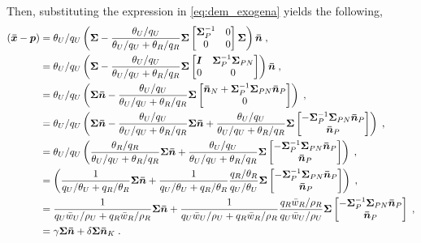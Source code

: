 Then, substituting the expression in \eqref{eq:dem_exogena} yields the following,
\begin{equation}
	\begin{split}
		(\bm{\Bar{x}}-\bm{p})&=\theta_{U}/q_{U}\left(\bm{\Sigma} - \frac{\theta_U/q_U}{\theta_U/q_U + \theta_R/q_R}\bm{\Sigma}\begin{bmatrix}
			\bm{\Sigma}^{-1}_{P} & 0\\
			0 & 0
		\end{bmatrix}
		\bm{\Sigma}
		\right)\bm{\Bar{n}}\;,\\
		&=\theta_{U}/q_{U}\left(\bm{\Sigma} - \frac{\theta_U/q_U}{\theta_U/q_U + \theta_R/q_R}\bm{\Sigma}\begin{bmatrix}
			\bm{I} & \bm{\Sigma}^{-1}_{P}\bm{\Sigma}_{PN}\\
			0 & 0
		\end{bmatrix}
		\right)\bm{\Bar{n}}\;,\\
		&= \theta_{U}/q_{U}\left(\bm{\Sigma}\bm{\Bar{n}} - \frac{\theta_U/q_U}{\theta_U/q_U + \theta_R/q_R}\bm{\Sigma}\begin{bmatrix}
			\bm{\Bar{n}}_{N}+\bm{\Sigma}^{-1}_{P}\bm{\Sigma}_{PN}\bm{\Bar{n}}_{P}\\
			0 
		\end{bmatrix}
		\right)\;,\\
		&= \theta_{U}/q_{U}\left(\bm{\Sigma}\bm{\Bar{n}} -\frac{\theta_U/q_U}{\theta_U/q_U + \theta_R/q_R}\bm{\Sigma}\bm{\Bar{n}}+ \frac{\theta_U/q_U}{\theta_U/q_U + \theta_R/q_R}\bm{\Sigma}\begin{bmatrix}
			-\bm{\Sigma}^{-1}_{P}\bm{\Sigma}_{PN}\bm{\Bar{n}}_{P}\\
			\bm{\Bar{n}}_{P} 
		\end{bmatrix}
		\right)\;,\\
		&= \theta_{U}/q_{U}\left(\frac{\theta_R/q_R}{\theta_U/q_U + \theta_R/q_R}\bm{\Sigma}\bm{\Bar{n}}+ \frac{\theta_U/q_U}{\theta_U/q_U + \theta_R/q_R}\bm{\Sigma}\begin{bmatrix}
			-\bm{\Sigma}^{-1}_{P}\bm{\Sigma}_{PN}\bm{\Bar{n}}_{P}\\
			\bm{\Bar{n}}_{P} 
		\end{bmatrix}
		\right)\;,\\
		&= \left(\frac{1}{q_U/\theta_U + q_R/\theta_R}\bm{\Sigma}\bm{\Bar{n}}+ \frac{1}{q_U/\theta_U + q_R/\theta_R}\frac{q_{R}/\theta_R}{q_U/\theta_U}\bm{\Sigma}\begin{bmatrix}
			-\bm{\Sigma}^{-1}_{P}\bm{\Sigma}_{PN}\bm{\Bar{n}}_{P}\\
			\bm{\Bar{n}}_{P} 
		\end{bmatrix}
		\right)\;,\\
		&= \frac{1}{q_U\Bar{w}_U/\rho_U + q_R\Bar{w}_R/\rho_R}\bm{\Sigma}\bm{\Bar{n}}+ \frac{1}{q_U\Bar{w}_U/\rho_U + q_R\Bar{w}_R/\rho_R}\frac{q_{R}\Bar{w}_R/\rho_R}{q_U\Bar{w}_U/\rho_U}\bm{\Sigma}\begin{bmatrix}
			-\bm{\Sigma}^{-1}_{P}\bm{\Sigma}_{PN}\bm{\Bar{n}}_{P}\\
			\bm{\Bar{n}}_{P} 
		\end{bmatrix}
		\;,\\
		&=\gamma\bm{\Sigma}\bm{\Bar{n}} + \delta\bm{\Sigma}\bm{\Bar{n}}_K\;.
	\end{split}
	\label{eq:id-boicott}
\end{equation}
